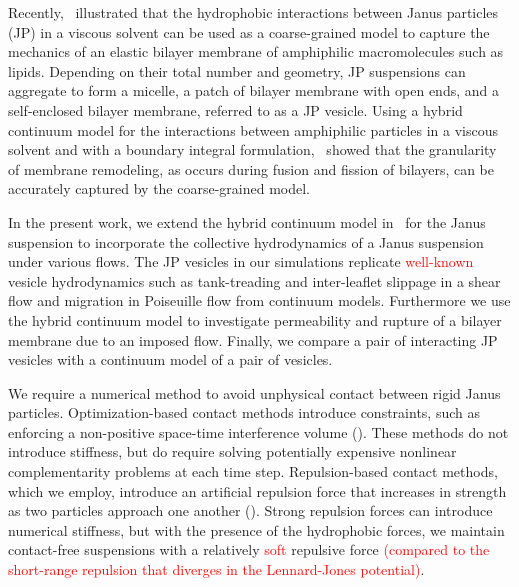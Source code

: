 \documentclass[lineno]{jfm}
\newcommand{\ReviewerOne}[1]{\textcolor{red}{#1}}
\begin{document}
Recently,~\cite{Fu20} illustrated that the hydrophobic interactions
between Janus particles (JP) in a viscous solvent can be used as a
coarse-grained model to capture the mechanics of an elastic bilayer
membrane of amphiphilic macromolecules such as lipids. Depending on
their total number and geometry, JP suspensions can aggregate to form a
micelle, a patch of bilayer membrane with open ends, and a self-enclosed
bilayer membrane, referred to as a JP vesicle. Using a hybrid continuum
model for the interactions between amphiphilic particles in a viscous
solvent and with a boundary integral formulation,~\cite{Fu20} showed
that the granularity of membrane remodeling, as occurs during fusion and
fission of bilayers, can be accurately captured by the coarse-grained
model.  

In the present work, we extend the hybrid continuum model in~\cite{Fu20}
for the Janus suspension to incorporate the collective hydrodynamics of
a Janus suspension under various flows. The JP vesicles in our
simulations replicate  \ReviewerOne{well-known} vesicle hydrodynamics
such as tank-treading and inter-leaflet slippage in a shear flow and
migration in Poiseuille flow from continuum models. Furthermore we use
the hybrid continuum model to investigate permeability and rupture of a
bilayer membrane due to an imposed flow.  Finally, we compare a pair of
interacting JP vesicles with a continuum model of a pair of vesicles.


We require a numerical method to avoid unphysical contact between rigid
Janus particles. Optimization-based contact methods introduce
constraints, such as enforcing a non-positive space-time interference
volume (\cite{lu-rah-zor2017, Lukas19, yan-cor-mal-vee-she2020}). These
methods do not introduce stiffness, but do require solving potentially
expensive nonlinear complementarity problems at each time step.
Repulsion-based contact methods, which we employ, introduce an
artificial repulsion force that increases in strength as two particles
approach one another (\cite{glo-pan-hes-jos-per2001, fen-mic2004,
kab-qua-bir2018}). Strong repulsion forces can introduce numerical
stiffness, but with the presence of the hydrophobic forces, we maintain
contact-free suspensions with a relatively \textcolor{red}{soft} repulsive
force \textcolor{red}{(compared to the short-range repulsion that diverges in the Lennard-Jones potential)}.
\end{document}
